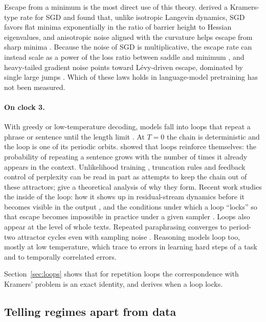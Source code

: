 Escape from a minimum is the most direct use of this theory. \citet{xie2020diffusion} derived a Kramers-type rate for SGD and found that, unlike isotropic Langevin dynamics, SGD favors flat minima exponentially in the ratio of barrier height to Hessian eigenvalues, and anisotropic noise aligned with the curvature helps escape from sharp minima \citep{zhu2018anisotropic}. Because the noise of SGD is multiplicative, the escape rate can instead scale as a power of the loss ratio between saddle and minimum \citep{mori2021powerlaw}, and heavy-tailed gradient noise points toward L\'evy-driven escape, dominated by single large jumps \citep{simsekli2019tailindex}. Which of these laws holds in language-model pretraining has not been measured.

\paragraph{On clock 3.} With greedy or low-temperature decoding, models fall into loops that repeat a phrase or sentence until the length limit \citep{holtzman2019curious}. At $T=0$ the chain is deterministic and the loop is one of its periodic orbits. \citet{xu2022learning} showed that loops reinforce themselves: the probability of repeating a sentence grows with the number of times it already appears in the context. Unlikelihood training \citep{welleck2019neural}, truncation rules \citep{hewitt2022truncation,meister2022locally} and feedback control of perplexity \citep{basu2020mirostat} can be read in part as attempts to keep the chain out of these attractors; \citet{fu2020theoretical} give a theoretical analysis of why they form. Recent work studies the inside of the loop: how it shows up in residual-stream dynamics before it becomes visible in the output \citep{zhang2026uncovering}, and the conditions under which a loop ``locks'' so that escape becomes impossible in practice under a given sampler \citep{chen2026repetition}. Loops also appear at the level of whole texts. Repeated paraphrasing converges to period-two attractor cycles even with sampling noise \citep{wang2025unveiling}. Reasoning models loop too, mostly at low temperature, which \citet{pipis2025wait} trace to errors in learning hard steps of a task and to temporally correlated errors.

Section~\ref{sec:loops} shows that for repetition loops the correspondence with Kramers' problem is an exact identity, and derives when a loop locks.

\subsection{Telling regimes apart from data}
\label{sec:regimes}

